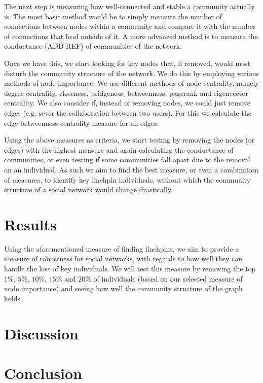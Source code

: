 \documentclass[9pt,twocolumn,twoside]{pnas-new}
\begin{document}
The next step is measuring how well-connected and stable a community actually is.
The most basic method would be to simply measure the number of connections between nodes within a community and compare it with the number of connections that lead outside of it.
A more advanced method is to measure the conductance (ADD REF) of communities of the network. 

Once we have this, we start looking for key nodes that, if removed, would most disturb the community structure of the network.
We do this by employing various methods of node importance.
We use different methods of node centrality, namely degree centrality, closeness, bridgeness, betweenness, pagerank and eigenvector centrality.
We also consider if, instead of removing nodes, we could just remove edges (e.g. sever the collaboration between two users).
For this we calculate the edge betweenness centrality measure for all edges.

Using the above measures as criteria, we start testing by removing the nodes (or edges) with the highest measure and 
again calculating the conductance of communities, 
or even testing if some communities fall apart due to the removal on an individual.
As such we aim to find the best measure, or even a combination of measures, to identify key linchpin individuals, 
without which the community structure of a social network would change drastically.

\section*{Results}

Using the aforementioned measure of finding linchpins, we aim to provide a measure of robustness for social networks,
with regards to how well they can handle the loss of key individuals. 
We will test this measure by removing the top $1\%$, $5\%$, $10\%$, $15\%$ and $20\%$ of individuals (based on our selected measure of node importance) 
and seeing how well the community structure of the graph holds.

\section*{Discussion}

\section*{Conclusion}


\end{document}

